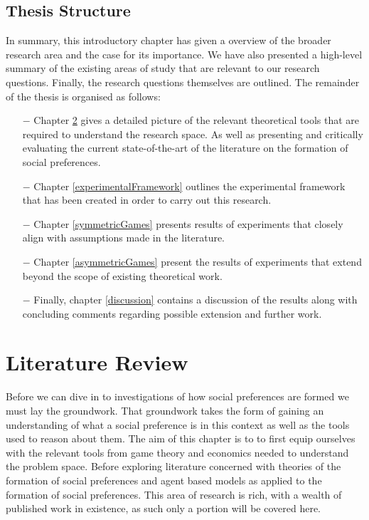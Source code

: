 \documentclass[11pt]{book}
\begin{document}
\section{Thesis Structure}
In summary, this introductory chapter has given a overview of the broader research area and the case for its importance.
We have also presented a high-level summary of the existing areas of study that are relevant to our research questions.
Finally, the research questions themselves are outlined.
The remainder of the thesis is organised as follows:

\begin{itemize}
	\item[$-$] Chapter \ref{lit_review} gives a detailed picture of the relevant theoretical tools that are required to understand the research space. 
		As well as presenting and critically evaluating the current state-of-the-art of the literature on the formation of social preferences.
	\item[$-$] Chapter \ref{experimentalFramework} outlines the experimental framework that has been created in order to carry out this research.
	\item [$-$] Chapter \ref{symmetricGames} presents results of experiments that closely align with assumptions made in the literature.
	\item [$-$] Chapter \ref{asymmetricGames} present the results of experiments that extend beyond the scope of existing theoretical work.
	\item [$-$] Finally, chapter \ref{discussion} contains a discussion of the results along with concluding comments regarding possible extension and further work.
\end{itemize}


\chapter{Literature Review}\label{lit_review}
Before we can dive in to investigations of how social preferences are formed we must lay the groundwork.
That groundwork takes the form of gaining an understanding of what a social preference is in this context as well as the tools used to reason about them.
The aim of this chapter is to to first equip ourselves with the relevant tools from game theory and economics needed to understand the problem space.
Before exploring literature concerned with theories of the formation of social preferences and agent based models as applied to the formation of social preferences. 
This area of research is rich, with a wealth of published work in existence, as such only a portion will be covered here.
\end{document}
